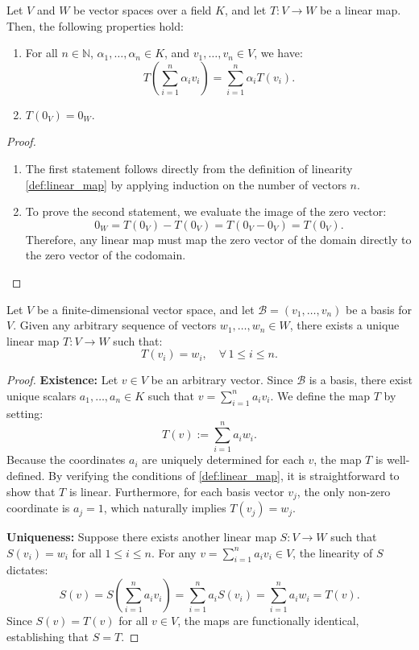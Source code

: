 \begin{proposition}
\label{prop:properties_linear_maps}
Let $V$ and $W$ be vector spaces over a field $K$, and let $T: V \to W$ be a linear map. Then, the following properties hold:
\begin{enumerate}
    \item For all $n \in \mathbb{N}$, $\alpha_1, \dots, \alpha_n \in K$, and $v_1, \dots, v_n \in V$, we have:
    \[
    T\left( \sum_{i=1}^n \alpha_i v_i \right) = \sum_{i=1}^n \alpha_i T(v_i).
    \]
    \item $T(0_V) = 0_W$.
\end{enumerate}
\end{proposition}

\begin{proof}
\begin{enumerate}
    \item The first statement follows directly from the definition of linearity \eqref{def:linear_map} by applying induction on the number of vectors $n$.
    \item To prove the second statement, we evaluate the image of the zero vector:
    \[
    0_W = T(0_V) - T(0_V) = T(0_V - 0_V) = T(0_V).
    \]
    Therefore, any linear map must map the zero vector of the domain directly to the zero vector of the codomain.
\end{enumerate}
\end{proof}

\begin{theorem}
\label{thm:existence_uniqueness_linear_map}
Let $V$ be a finite-dimensional vector space, and let $\mathcal{B} = (v_1, \dots, v_n)$ be a basis for $V$. Given any arbitrary sequence of vectors $w_1, \dots, w_n \in W$, there exists a unique linear map $T: V \to W$ such that:
\[
T(v_i) = w_i, \quad \forall \, 1 \le i \le n.
\]
\end{theorem}

\begin{proof}
\textbf{Existence:} Let $v \in V$ be an arbitrary vector. Since $\mathcal{B}$ is a basis, there exist unique scalars $a_1, \dots, a_n \in K$ such that $v = \sum_{i=1}^n a_i v_i$. We define the map $T$ by setting:
\begin{equation}
\label{eq:T_def_existence}
T(v) := \sum_{i=1}^n a_i w_i.
\end{equation}
Because the coordinates $a_i$ are uniquely determined for each $v$, the map $T$ is well-defined. By verifying the conditions of \cref{def:linear_map}, it is straightforward to show that $T$ is linear. Furthermore, for each basis vector $v_j$, the only non-zero coordinate is $a_j = 1$, which naturally implies $T(v_j) = w_j$.

\textbf{Uniqueness:} Suppose there exists another linear map $S: V \to W$ such that $S(v_i) = w_i$ for all $1 \le i \le n$. For any $v = \sum_{i=1}^n a_i v_i \in V$, the linearity of $S$ dictates:
\[
S(v) = S\left( \sum_{i=1}^n a_i v_i \right) = \sum_{i=1}^n a_i S(v_i) = \sum_{i=1}^n a_i w_i = T(v).
\]
Since $S(v) = T(v)$ for all $v \in V$, the maps are functionally identical, establishing that $S = T$.
\end{proof}


